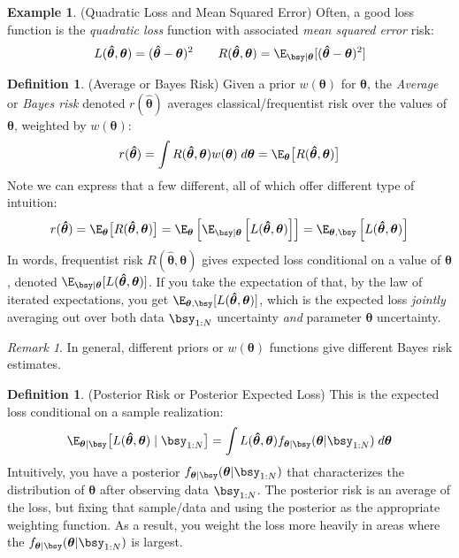 \documentclass[12pt]{article}
\theoremstyle{plain}
\theoremstyle{definition}
\newtheorem{defn}[thm]{Definition}
\newtheorem{ex}[thm]{Example}
\theoremstyle{remark}
\newtheorem*{rmk}{Remark}
\newcommand{\bstheta}{\boldsymbol{\theta}}
\newcommand{\bshattheta}{\boldsymbol{\hat{\theta}}}
\begin{document}
\begin{ex}(Quadratic Loss and Mean Squared Error)
Often, a good loss function is the \emph{quadratic loss} function
with associated \emph{mean squared error} risk:
\begin{align*}
  L(\bshattheta,\bstheta) = (\bshattheta-\bstheta)^2
  \qquad
  R(\bshattheta,\bstheta)
  = \E_{\bsy|\bstheta}[(\bshattheta-\bstheta)^2]
\end{align*}
\end{ex}

\begin{defn}(Average or Bayes Risk)
\label{defn:bayesrisk}
Given a prior $w(\bstheta)$ for $\bstheta$, the \emph{Average} or
\emph{Bayes risk} denoted $r(\bshattheta)$ averages
classical/frequentist risk over the values of $\bstheta$, weighted by
$w(\bstheta)$:
\begin{align*}
  r(\bshattheta)
  = \int R(\bshattheta,\bstheta) w(\bstheta) \; d\bstheta
  = \E_{\bstheta}\big[ R(\bshattheta,\bstheta)\big]
\end{align*}
Note we can express that a few different, all of which offer different
type of intuition:
\begin{align*}
  r(\bshattheta)
  = \E_{\bstheta}\big[ R(\bshattheta,\bstheta)\big]
  = \E_{\bstheta}\left[
      \E_{\bsy|\bstheta}\left[
      L(\bshattheta,\bstheta)
      \right]
    \right]
  = \E_{\bstheta,\bsy}\left[ L(\bshattheta,\bstheta) \right]
\end{align*}
In words, frequentist risk $R(\bshattheta,\bstheta)$ gives expected loss
conditional on a value of $\bstheta$, denoted
$\E_{\bsy|\bstheta}[L(\bshattheta,\bstheta)]$. If you take the
expectation of that, by the law of iterated expectations, you get
$\E_{\bstheta,\bsy}[L(\bshattheta,\bstheta)]$, which is the expected
loss \emph{jointly} averaging out over both data $\bsy_{1:N}$
uncertainty \emph{and} parameter $\bstheta$ uncertainty.
\end{defn}
\begin{rmk}
In general, different priors or $w(\bstheta)$ functions give
different Bayes risk estimates.
\end{rmk}
\clearpage

\begin{defn}{(Posterior Risk or Posterior Expected Loss)}
This is the expected loss conditional on a sample realization:
\begin{align*}
  \E_{\bstheta|\bsy}\big[
    L(\bshattheta,\bstheta)\;|\;\bsy_{1:N}
  \big]
  =
  \int L(\bshattheta,\bstheta)
  f_{\bstheta|\bsy}(\bstheta|\bsy_{1:N}) \; d\bstheta
\end{align*}
Intuitively, you have a posterior
$f_{\bstheta|\bsy}(\bstheta|\bsy_{1:N})$ that characterizes the
distribution of $\bstheta$ after observing data $\bsy_{1:N}$. The
posterior risk is an average of the loss, but fixing that sample/data
and using the posterior as the appropriate weighting function. As a
result, you weight the loss more heavily in areas where the
$f_{\bstheta|\bsy}(\bstheta|\bsy_{1:N})$ is largest.
\end{defn}
\end{document}
